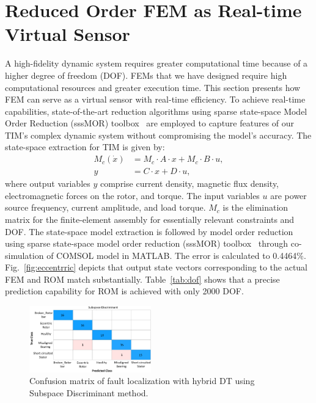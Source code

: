 \documentclass[a4paper,conference]{IEEEtran}
\begin{document}
\section{Reduced Order FEM as Real-time Virtual Sensor}\label{sec:virtualFEM}

A high-fidelity dynamic system requires greater computational time because of a higher degree of freedom (DOF). FEMs that we have designed require high computational resources and greater execution time. This section presents how FEM can serve as a virtual sensor with real-time efficiency. 
To achieve real-time capabilities, state-of-the-art reduction algorithms using sparse state-space Model Order Reduction (sssMOR) toolbox~\cite{castagnotto2017sss} are employed to capture features of our TIM's complex dynamic system without compromising the model's accuracy. The state-space extraction for TIM is given by:
\begin{align}
M_{c}(\dot{x}) &= M_{c} \cdot A\cdot{x} + M_{c} \cdot B\cdot{u}, \label{eq:equation1} \\
y &= C\cdot{x} + D\cdot{u}, \label{eq:equation2}
\end{align}
where output variables $y$ comprise current density, magnetic flux density, electromagnetic forces on the rotor, and torque. The input variables $u$ are power source frequency, current amplitude, and load torque. $M_c$ is the elimination matrix for the finite-element assembly for essentially relevant constraints and DOF. The state-space model extraction is followed by model order reduction using sparse state-space model order reduction (sssMOR) toolbox~\cite{castagnottosss} through co-simulation of COMSOL model in MATLAB. The error is calculated to 0.4464\%. Fig.~\ref{fig:eccentrric} depicts that output state vectors corresponding to the actual FEM and ROM match substantially. Table~\ref{tab:dof} shows that a precise prediction capability for ROM is achieved with only 2000 DOF.



 \begin{figure}[b!]
    \centering
    \includegraphics[width=0.47\textwidth]{Figs/attempt11.png}
    \caption{Confusion matrix of fault localization with hybrid DT using Subspace Discriminant method.}
    \label{fig:with_fusion}
\end{figure}
\end{document}
